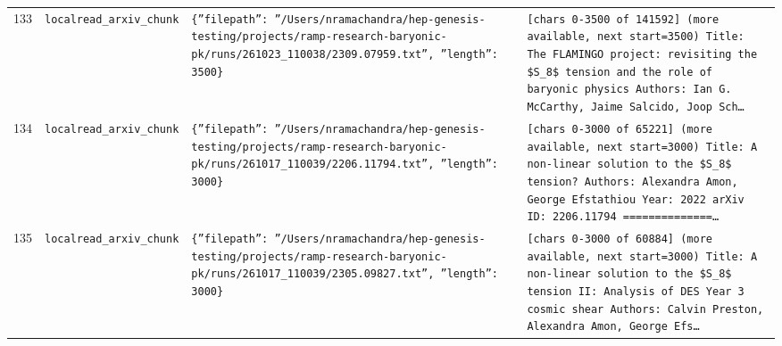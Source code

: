 \documentclass[11pt,a4paper]{article}
\begin{document}
\begin{longtable}{@{}p{}p{}p{}p{}@{}}
133 & \texttt{local}\newline\texttt{read\_\allowbreak{}arxiv\_\allowbreak{}chunk} & \texttt{\{''filepath'':\allowbreak{} ''/\allowbreak{}Users/\allowbreak{}nramachandra/\allowbreak{}hep-genesis-testing/\allowbreak{}projects/\allowbreak{}ramp-research-baryonic-pk/\allowbreak{}runs/\allowbreak{}261023\_\allowbreak{}110038/\allowbreak{}2309.07959.txt'',\allowbreak{} ''length'':\allowbreak{} 3500\}\allowbreak{}} & \texttt{[chars 0-3500 of 141592]\allowbreak{} (more available,\allowbreak{} next start=\allowbreak{}3500)\allowbreak{}  Title:\allowbreak{} The FLAMINGO project:\allowbreak{} revisiting the \$S\_\allowbreak{}8\$ tension and the role of baryonic physics Authors:\allowbreak{} Ian G. McCarthy,\allowbreak{} Jaime Salcido,\allowbreak{} Joop Sch\ldots{}\allowbreak{}} \\
134 & \texttt{local}\newline\texttt{read\_\allowbreak{}arxiv\_\allowbreak{}chunk} & \texttt{\{''filepath'':\allowbreak{} ''/\allowbreak{}Users/\allowbreak{}nramachandra/\allowbreak{}hep-genesis-testing/\allowbreak{}projects/\allowbreak{}ramp-research-baryonic-pk/\allowbreak{}runs/\allowbreak{}261017\_\allowbreak{}110039/\allowbreak{}2206.11794.txt'',\allowbreak{} ''length'':\allowbreak{} 3000\}\allowbreak{}} & \texttt{[chars 0-3000 of 65221]\allowbreak{} (more available,\allowbreak{} next start=\allowbreak{}3000)\allowbreak{}  Title:\allowbreak{} A non-linear solution to the \$S\_\allowbreak{}8\$ tension? Authors:\allowbreak{} Alexandra Amon,\allowbreak{} George Efstathiou Year:\allowbreak{} 2022 arXiv ID:\allowbreak{} 2206.11794  =\allowbreak{}=\allowbreak{}=\allowbreak{}=\allowbreak{}=\allowbreak{}=\allowbreak{}=\allowbreak{}=\allowbreak{}=\allowbreak{}=\allowbreak{}=\allowbreak{}=\allowbreak{}=\allowbreak{}=\allowbreak{}\ldots{}\allowbreak{}} \\
135 & \texttt{local}\newline\texttt{read\_\allowbreak{}arxiv\_\allowbreak{}chunk} & \texttt{\{''filepath'':\allowbreak{} ''/\allowbreak{}Users/\allowbreak{}nramachandra/\allowbreak{}hep-genesis-testing/\allowbreak{}projects/\allowbreak{}ramp-research-baryonic-pk/\allowbreak{}runs/\allowbreak{}261017\_\allowbreak{}110039/\allowbreak{}2305.09827.txt'',\allowbreak{} ''length'':\allowbreak{} 3000\}\allowbreak{}} & \texttt{[chars 0-3000 of 60884]\allowbreak{} (more available,\allowbreak{} next start=\allowbreak{}3000)\allowbreak{}  Title:\allowbreak{} A non-linear solution to the \$S\_\allowbreak{}8\$ tension II:\allowbreak{} Analysis of DES Year 3 cosmic shear Authors:\allowbreak{} Calvin Preston,\allowbreak{} Alexandra Amon,\allowbreak{} George Efs\ldots{}\allowbreak{}} \\

\end{longtable}
\end{document}
